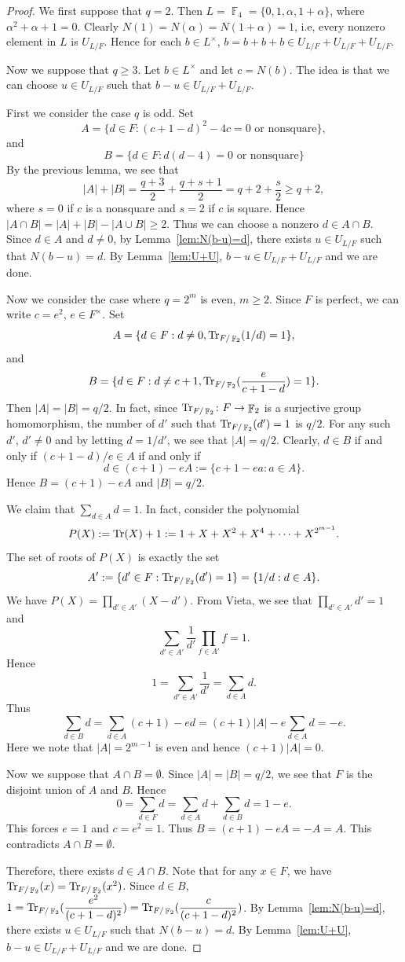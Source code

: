 \documentclass[11pt, a4paper]{amsart}
\theoremstyle{definition}
\DeclareMathOperator{\F}{\mathbb{F}}
\numberwithin{equation}{section}
\begin{document}
\begin{proof}
We first suppose that $q=2$. Then $L=\F_4=\{0,1,\alpha,1+\alpha\}$, where $\alpha^2+\alpha+1=0$. Clearly $N(1)=N(\alpha)=N(1+\alpha)=1$, i.e, every nonzero element in $L$ is $U_{L/F}$. Hence for each $b\in L^\times$, $b=b+b+b\in  U_{L/F}+U_{L/F}+U_{L/F}$.

Now we suppose that $q\geq 3$. Let $b\in L^\times$ and let $c=N(b)$. The idea is that we can choose $u\in U_{L/F}$ such that $b-u\in U_{L/F}+U_{L/F}.$

First we consider the case $q$ is odd. Set
\[
A=\{d\in F: (c+1-d)^2-4c=0 \text{ or nonsquare}\},
\]
and 
\[
B=\{d\in F: d(d-4)=0 \text{ or nonsquare}\}
\]
By the previous lemma, we see that 
 \[|A|+|B|=\dfrac{q+3}{2} + \frac{q+s+1}{2}=q+2 +\dfrac{s}{2}\geq q+2,\]
 where $s=0$ if $c$ is a nonsquare and $s=2$ if $c$ is square. 
Hence $|A\cap B|=|A|+|B| -|A\cup B|\geq 2$. Thus we can  choose a nonzero $d\in A\cap B$. Since $d\in A$ and $d\not=0$, by Lemma~\ref{lem:N(b-u)=d}, there exists $u\in U_{L/F}$ such that $N(b-u)=d$. By Lemma~\ref{lem:U+U}, $b-u\in U_{L/F}+U_{L/F}$ and we are done.

Now we consider the case where $q=2^m$ is even, $m\geq 2$. Since $F$ is perfect, we can write $c=e^2$, $e\in F^\times$. 
Set
\[A=\{d\in F: d\not=0, {\rm Tr}_{F/\F_2}(1/d)=1\},
\]
and
\[
B=\{ d\in F: d\not=c+1, {\rm Tr}_{F/\F_2}(\dfrac{e}{c+1-d})=1\}.
\]
Then $|A|=|B|=q/2$. In fact, since ${\rm Tr}_{F/\F_2}\colon F\to \F_2$ is a surjective group homomorphism, the number of $d'$ such that ${\rm Tr}_{F/\F_2}(d')=1$ is $q/2$. For any such $d'$, $d'\not=0$ and by letting $d=1/d'$, we see that $|A|=q/2$. Clearly, $d\in B$ if and only if $(c+1-d)/e\in A$ if and only if 
\[d\in (c+1) -eA:= \{c+1 -ea: a\in A\}.\]
Hence $B= (c+1)-eA$ and $|B|=q/2$. 

We claim that $\sum\limits_{d\in A} d=1$. In fact, consider the polynomial
\[
P(X) :={\rm Tr}(X)+1 := 1+ X+X^2+X^4+\cdots+ X^{2^{m-1}}.
\]
The set of roots of $P(X)$ is exactly the set 
\[A':=\{d'\in F: {\rm Tr}_{F/\F_2}(d')=1\}=\{1/d: d\in A\}.\]
We have $P(X)=\prod\limits_{d'\in A'}(X-d')$. From Vieta, we see that $\prod_{d'\in A'} d'=1$ and 
\[
\sum_{d'\in A'} \dfrac{1}{d'}\prod_{f\in A'}f=1. 
\]
Hence 
\[
1=\sum_{d'\in A'} \dfrac{1}{d'}=\sum_{d\in A} d. 
\]
Thus
\[
\sum_{d\in B} d=\sum_{d\in A} (c+1)-ed =(c+1)|A|- e\sum_{d\in A} d=-e.
\]
Here we note that $|A|=2^{m-1}$ is even and hence $(c+1)|A|=0$. 

Now we suppose that $A\cap B=\emptyset$. Since $|A|=|B|=q/2$, we see that $F$ is the disjoint union of $A$ and $B$. Hence
\[
0=\sum_{d\in F}d= \sum_{d\in A}d +\sum_{d\in B}d= 1-e.
\]
This forces $e=1$ and $c=e^2=1$. Thus $B=(c+1)-eA=-A=A$. This contradicts $A\cap B=\emptyset$.

Therefore, there exists $d\in A\cap B$. Note that for any $x\in F$, we have ${\rm Tr}_{F/\F_2}(x)={\rm Tr}_{F/\F_2}(x^2)$. Since $d\in B$, $1={\rm Tr}_{F/\F_2}(\dfrac{e^2}{(c+1-d)^2})={\rm Tr}_{F/\F_2}(\dfrac{c}{(c+1-d)^2})$. By Lemma~\ref{lem:N(b-u)=d}, there exists $u\in U_{L/F}$ such that $N(b-u)=d$. By Lemma~\ref{lem:U+U}, $b-u\in U_{L/F}+U_{L/F}$ and we are done.
\end{proof} 
\end{document}
